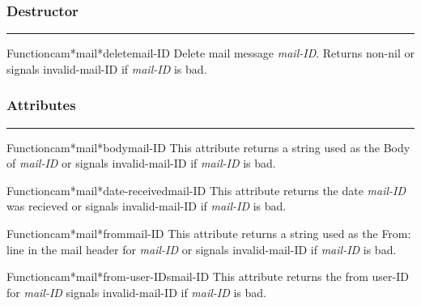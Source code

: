 \subsubsection*{Destructor}
\par\vspace*{0.00in}\par\hrule\par\medskip\par


\begin{functiondoc}{Function}{cam*mail*delete}{mail-ID}
Delete mail message {\em mail-ID}.
Returns non-nil or signals invalid-mail-ID if {\em mail-ID} is bad.
\end{functiondoc}


\subsubsection*{Attributes}
\par\vspace*{0.00in}\par\hrule\par\medskip\par


\begin{functiondoc}{Function}{cam*mail*body}{mail-ID}
This attribute returns a string used as the Body of
{\em mail-ID} or signals invalid-mail-ID if {\em mail-ID} is bad.
\end{functiondoc}

\begin{functiondoc}{Function}{cam*mail*date-received}{mail-ID}
This attribute returns the date {\em mail-ID} was recieved or signals 
invalid-mail-ID if {\em mail-ID} is bad.
\end{functiondoc}

\begin{functiondoc}{Function}{cam*mail*from}{mail-ID}
This attribute returns a string used as the From: line in the mail header for
{\em mail-ID} or signals invalid-mail-ID if {\em mail-ID} is bad.
\end{functiondoc}

\begin{functiondoc}{Function}{cam*mail*from-user-IDs}{mail-ID}
This attribute returns the from user-ID for {\em mail-ID} signals 
invalid-mail-ID if {\em mail-ID} is bad.
\end{functiondoc}

